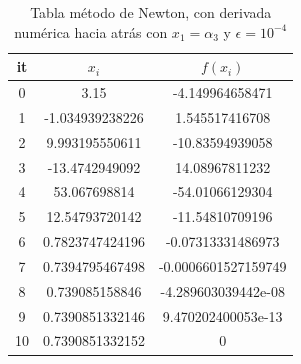 \documentclass{article} %
\begin{document}
\begin{table}
\centering
\begin{tabular}{|c|c|c|}
\hline
it & $x_i$ & $f(x_i)$\\
\hline
0 & 3.15 & -4.149964658471\\
1 & -1.034939238226 & 1.545517416708\\
2 & 9.993195550611 & -10.83594939058\\
3 & -13.4742949092 & 14.08967811232\\
4 & 53.067698814 & -54.01066129304\\
5 & 12.54793720142 & -11.54810709196\\
6 & 0.7823747424196 & -0.07313331486973\\
7 & 0.7394795467498 & -0.0006601527159749\\
8 & 0.739085158846 & -4.289603039442e-08\\
9 & 0.7390851332146 & 9.470202400053e-13\\
10 & 0.7390851332152 & 0\\
\hline
\end{tabular}
\caption{Tabla método de Newton, con derivada numérica hacia atrás con $x_1 = \alpha_3$ y $\epsilon = 10^{-4}$}
\end{table}
\end{document}

